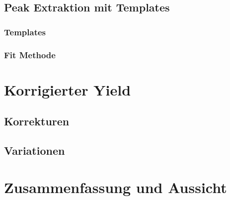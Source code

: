 \documentclass[]{article}
\begin{document}
	\subsection{Peak Extraktion mit Templates}
	\subsubsection{Templates}
	\subsubsection{Fit Methode}
	\section{Korrigierter Yield}
	\subsection{Korrekturen}
	\subsection{Variationen}
	\section{Zusammenfassung und Aussicht}
\end{document}
